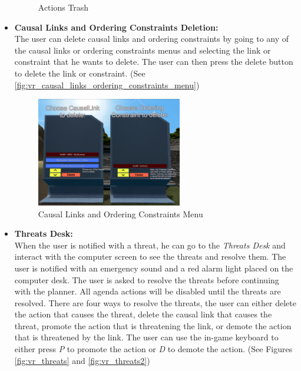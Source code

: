 \begin{itemize}
\begin{figure}[h]
\begin{minipage}{0.4\textwidth}
                  \caption[Trash in VR]{Actions Trash}
                  \label{fig:vr_trash}
              \end{minipage}
          \end{figure}

    \item \textbf{Causal Links and Ordering Constraints Deletion:} \\
          The user can delete causal links and ordering constraints by going to any of the causal links or ordering constraints menus and selecting the link or constraint that he wants to delete. The user can then press the delete button to delete the link or constraint. (See \autoref{fig:vr_causal_links_ordering_constraints_menu})

          \begin{figure}[h]
              \centering
              \includegraphics[width=0.6\textwidth]{images/delete_links_order.png}
              \caption[Causal Links and Ordering Constraints Menu in VR]{Causal Links and Ordering Constraints Menu}
              \label{fig:vr_causal_links_ordering_constraints_menu}
          \end{figure}

    \item \textbf{Threats Desk:} \\
          When the user is notified with a threat, he can go to the \textit{Threats Desk} and interact with the computer screen to see the threats and resolve them. The user is notified with an emergency sound and a red alarm light placed on the computer desk. The user is asked to resolve the threats before continuing with the planner. All agenda actions will be disabled until the threats are resolved. There are four ways to resolve the threats, the user can either delete the action that causes the threat, delete the causal link that causes the threat, promote the action that is threatening the link, or demote the action that is threatened by the link. The user can use the in-game keyboard to either press \textit{P} to promote the action or \textit{D} to demote the action.
          (See Figures \ref{fig:vr_threats} and \ref{fig:vr_threats2})


\end{itemize}
